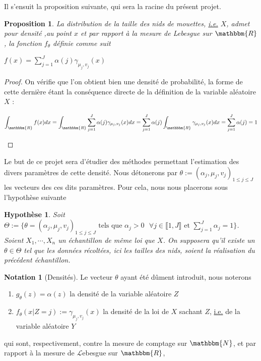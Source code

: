 \documentclass[frenchb]{report}
\newcommand{\R}{\mathbbm{R}}
\newcommand{\N}{\mathbbm{N}}
\newcommand{\1}{\mathbbm{1}}
\newtheorem{prop}{Proposition}
\newtheorem{hyp}{Hypothèse}
\theoremstyle{definition}\newtheorem{defn}{Définition}
\theoremstyle{definition}\newtheorem{exm}{Exemple}
\theoremstyle{definition}\newtheorem{nota}{Notation}
\theoremstyle{definition}\newtheorem{rem}{Remarque}
\begin{document}
Il s'ensuit la proposition suivante, qui sera la racine du présent projet.
\begin{prop}
La distribution de la taille des nids de mouettes, \underline{i.e.} $X$, admet pour densité ,au point $x$ et par rapport à la mesure de Lebesgue sur $\R$, la fonction $f_ \theta$ définie comme suit
\begin{center} $f(x) = \displaystyle\sum_{j=1}^J \alpha(j) \gamma_{\mu_j, v_j}(x) $ \end{center}
\end{prop}

\begin{proof}
On vérifie que l'on obtient bien une densité de probabilité, la forme de cette dernière étant la conséquence directe de la définition de la variable aléatoire $X$ : \newline
\begin{center} $\displaystyle\int_\R f(x) dx = \int_\R\sum_{j=1}^J \alpha(j) \gamma_{\mu_j, v_j}(x)dx = \sum_{j=1}^J\alpha(j)\int_\R \gamma_{\mu_j, v_j}(x)dx = \sum_{j=1}^J\alpha(j) = 1$ \end{center}
\end{proof}

Le but de ce projet sera d'étudier des méthodes permettant l'estimation des divers paramètres de cette densité. Nous détonerons par $\theta := (\alpha_j, \mu_j, v_j)_{1\leq j\leq J}$ les vecteurs des ces dits paramètres. \newline
Pour cela, nous nous placerons sous l'hypothèse suivante

\begin{hyp}
Soit $\Theta := \{ \theta = (\alpha_j,\mu_j, v_j)_{1 \leq j \leq J} \text{ tels que } \alpha_j > 0 \text{ } \forall j\in \llbracket 1,J\rrbracket \text{ et } \displaystyle\sum_{j=1}^J\alpha_j=1\}$. Soient $X_1, \cdots, X_n$ un échantillon de même loi que $X$. On supposera qu'il existe un $\theta \in \Theta$ tel que les données récoltées, ici les tailles des nids, soient la réalisation du précédent échantillon.
\end{hyp}

\begin{nota}[Densités]
Le vecteur $\theta$ ayant été dûment introduit, nous noterons
\begin{enumerate}
	\item $g_\theta(z) = \alpha(z)$ la densité de la variable aléatoire $Z$
	\item $f_\theta(x | Z=j) := \gamma_{\mu_j, v_j}(x)$  la densité de la loi de $X$ sachant $Z$, \underline{i.e.} de la variable aléatoire $Y$
\end{enumerate}
qui sont, respectivement, contre la mesure de comptage sur $\N$, et par rapport à la mesure de $\mathcal{L}$ebesgue sur $\R$,
\end{nota}
\end{document}
